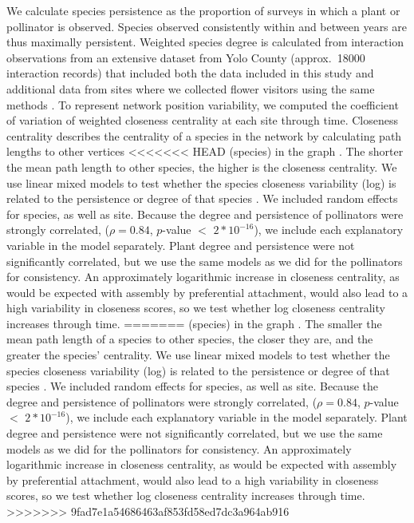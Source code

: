 \documentclass[12pt]{article}
\begin{document}
We calculate species persistence as the proportion of surveys in which
a plant or pollinator is observed. Species observed consistently
within and between years are thus maximally persistent. Weighted
species degree is calculated from interaction observations from an
extensive dataset from Yolo County (approx.~18000 interaction records)
that included both the data included in this study and additional data
from sites where we collected flower visitors using the same methods
\citep{mgonigle-2015-x, ponisio2015farm}. To represent network
position variability, we computed the coefficient of variation of
weighted closeness centrality \citep{freeman1978centrality} at each
site through time. Closeness centrality describes the centrality of a
species in the network by calculating path lengths to other vertices
<<<<<<< HEAD
(species) in the graph \citep{freeman1978centrality}. The shorter the
mean path length to other species, the higher is the closeness
centrality. We use linear mixed models to test whether the species
closeness variability (log) is related to the persistence or degree of
that species \citep{lme4, lmetest}. We included random effects for
species, as well as site. Because the degree and persistence of
pollinators were strongly correlated, ($\rho = 0.84$, $p$-value $<$
$2*10^{-16}$), we include each explanatory variable in the model
separately. Plant degree and persistence were not significantly
correlated, but we use the same models as we did for the pollinators
for consistency. An approximately logarithmic increase in closeness
centrality, as would be expected with assembly by preferential
attachment, would also lead to a high variability in closeness scores,
so we test whether log closeness centrality increases through time.
=======
(species) in the graph \citep{freeman1978centrality}. The smaller the mean path length of a species to other species, the closer they are, and the greater the species' centrality. We use linear
mixed models to test whether the species closeness variability (log)
is related to the persistence or degree of that species \citep{lme4,
  lmetest}. We included random effects for species, as well as
site. Because the degree and persistence of pollinators were strongly
correlated, ($\rho = 0.84$, $p$-value $<$ $2*10^{-16}$), we include
each explanatory variable in the model separately. Plant degree and
persistence were not significantly correlated, but we use the same
models as we did for the pollinators for consistency. An approximately
logarithmic increase in closeness centrality, as would be expected
with assembly by preferential attachment, would also lead to a high
variability in closeness scores, so we test whether log closeness
centrality increases through time.
>>>>>>> 9fad7e1a54686463af853fd58ed7dc3a964ab916
\end{document}
